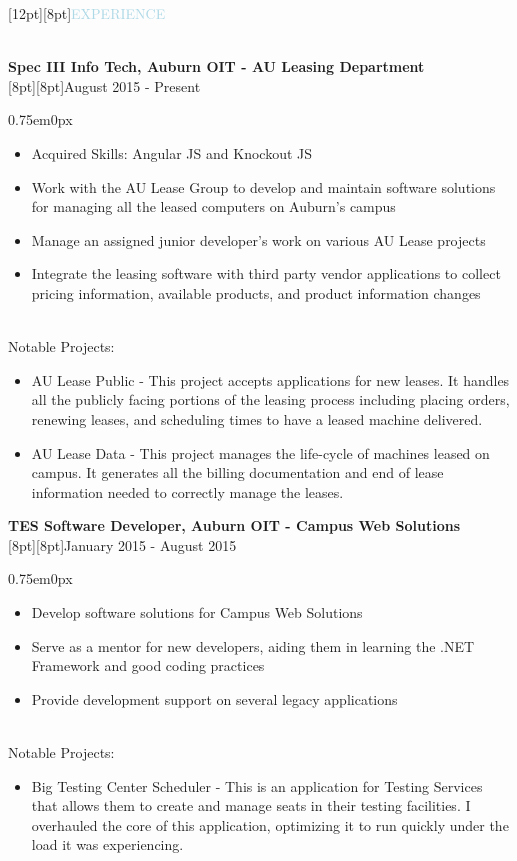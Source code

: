 \documentclass{res}
\newenvironment{ResumeBlock}[1]
{
	\begin{normalsize}
		\raisebox{0pt}[12pt][8pt]{\textcolor{lightblue}{#1}}
	\end{normalsize}
	\\
}
{	
}
\newenvironment{DetailsBlock}[2]
{
	\textbf{\color{darkfont}#1}
	\\
	\raisebox{0pt}[8pt][8pt]{#2}
	\begin{adjustwidth}{0.75em}{0px}
}
{	
	\end{adjustwidth}
}
\begin{document}
	\begin{ResumeBlock}{EXPERIENCE}
		\begin{DetailsBlock}{Spec III Info Tech, Auburn OIT - AU Leasing Department}{August 2015 - Present}
			\begin{itemize}
				\item Acquired Skills:  Angular JS and Knockout JS 
				\item Work with the AU Lease Group to develop and maintain software solutions for managing all the leased computers on Auburn's campus
				\item Manage an assigned junior developer's work on various AU Lease projects
				\item Integrate the leasing software with third party vendor  applications to collect pricing information, available products, and product information changes
			\end{itemize}
			~\\
			Notable Projects:
			\begin{itemize}
				\item AU Lease Public - This project accepts applications for new leases.  It handles all the publicly facing portions of the leasing process including placing orders, renewing leases, and scheduling times to have a leased machine delivered. 
				\item AU Lease Data - This project manages the life-cycle of machines leased on campus.  It generates all the billing documentation and end of lease information needed to correctly manage the leases.    
			\end{itemize}
		\end{DetailsBlock}		
		\begin{DetailsBlock}{TES Software Developer, Auburn OIT - Campus Web Solutions}{January 2015 - August 2015}
			\begin{itemize}
				\item Develop software solutions for Campus Web Solutions
				\item Serve as a mentor for new developers, aiding them in learning the .NET Framework and good coding practices 
				\item Provide development support on several legacy applications
			\end{itemize}
			~\\
			Notable Projects:
			\begin{itemize}
				\item Big Testing Center Scheduler - This is an application for Testing Services that allows them to create and manage seats in their testing facilities.  I overhauled the core of this application, optimizing it to run quickly under the load it was experiencing.

\end{itemize}
\end{DetailsBlock}
\end{ResumeBlock}
\end{document}

